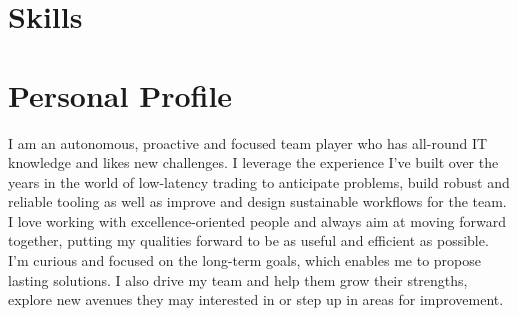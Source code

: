 \documentclass[11pt,a4paper,sans]{moderncv}        %
\begin{document}
\section{Skills}

\section{Personal Profile}
I am an autonomous, proactive and focused team player who has all-round IT knowledge and likes new challenges. I leverage the experience I've built over the years in the world of low-latency trading to anticipate problems, build robust and reliable tooling as well as improve and design sustainable workflows for the team.\newline
I love working with excellence-oriented people and always aim at moving forward together, putting my qualities forward to be as useful and efficient as possible. I'm curious and focused on the long-term goals, which enables me to propose lasting solutions. I also drive my team and help them grow their strengths, explore new avenues they may interested in or step up in areas for improvement.
\end{document}
